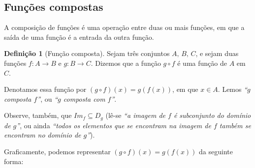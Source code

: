 \documentclass[12pt,openright,twoside,a4paper]{article}
\theoremstyle{definition}
\newtheorem{definition}{Definição}[section]
\begin{document}
	
	\subsection{Funções compostas}\label{subsec:funcoes_compostas}
	
	A composição de funções é uma operação entre duas ou mais funções, em que a saída de uma função é a entrada da outra função.
	
	\begin{definition}[Função composta]
		Sejam três conjuntos $A,\, B,\, C$, e sejam duas funções $f: A \longrightarrow B$ e $g: B \longrightarrow C$. Dizemos que a função $g \circ f$ é uma função de $A$ em $C$.
		
		Denotamos essa função por $(g \circ f)(x) = g(f(x))$, em que $x \in A$. Lemos \textit{``$g$ composta $f$''}, ou \textit{``$g$ composta com $f$''}. 
		
		Observe, também, que $Im_f \subseteq D_g$ (lê-se \textit{``a imagem de $f$ é subconjunto do domínio de $g$''}, ou ainda \textit{``todos os elementos que se encontram na imagem de $f$ também se encontram no domínio de $g$''}).
	\end{definition}

	
	Graficamente, podemos representar $(g \circ f)(x) = g(f(x))$ da seguinte forma:
	
\end{document}
